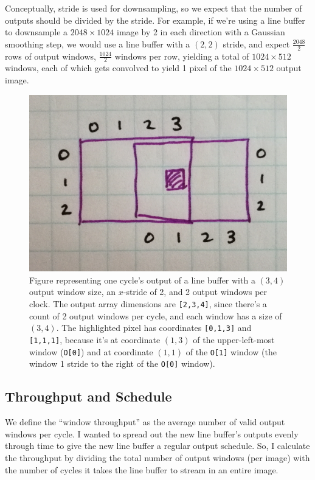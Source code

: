 \documentclass[12pt]{article}
\begin{document}
Conceptually, stride is used for downsampling, so we expect that the
number of outputs should be divided by the stride. For example, if
we're using a line buffer to downsample a $2048\times 1024$ image by 2
in each direction with a Gaussian smoothing step, we would use a line
buffer with a $(2,2)$ stride, and expect $\frac{2048}{2}$ rows of
output windows, $\frac{1024}{2}$ windows per row, yielding a total of
$1024\times 512$ windows, each of which gets convolved to yield 1
pixel of the $1024 \times 512$ output image.

\begin{figure}[htb!]
  \centering
  \includegraphics[width=0.6\linewidth]{Figures/lb-format.jpg}
  \caption{Figure representing one cycle's output of a line buffer
    with a $(3,4)$ output window size, an $x$-stride of 2, and 2
    output windows per clock. The output array dimensions are
    \texttt{[2,3,4]}, since there's a count of 2 output windows per
    cycle, and each window has a size of $(3,4)$. The highlighted
    pixel has coordinates \texttt{[0,1,3]} and \texttt{[1,1,1]},
    because it's at coordinate $(1,3)$ of the upper-left-most window
    (\texttt{O[0]}) and at coordinate $(1,1)$ of the \texttt{O[1]}
    window (the window 1 stride to the right of the \texttt{O[0]}
    window).}
  \label{4D_output}
\end{figure}

\newpage
\subsection{Throughput and Schedule}

We define the ``window throughput'' as the average number of valid
output windows per cycle. I wanted to spread out the new line buffer's
outputs evenly through time to give the new line buffer a regular
output schedule. So, I calculate the throughput by dividing the total
number of output windows (per image) with the number of cycles it
takes the line buffer to stream in an entire image.
\end{document}
